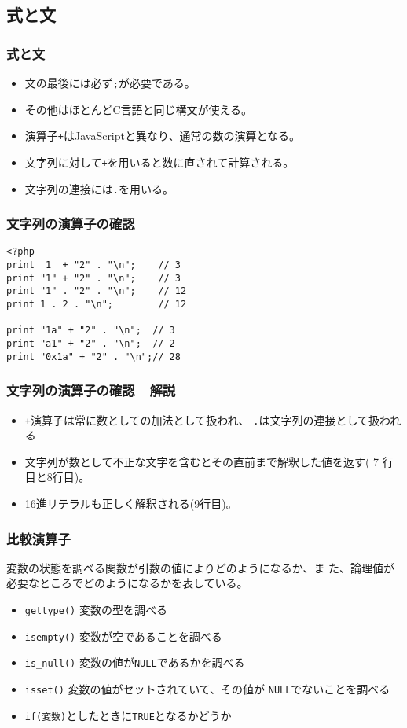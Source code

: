 \documentclass[dvipsk]{beamer}
\begin{document}
\subsection{式と文}
\begin{frame}[containsverbatim]
\frametitle{式と文}
\begin{itemize}
 \item 文の最後には必ず\texttt{;}が必要である。
 \item その他はほとんどC言語と同じ構文が使える。
 \item 演算子\texttt{+}はJavaScriptと異なり、通常の数の演算となる。
 \item 文字列に対して\texttt{+}を用いると数に直されて計算される。
 \item 文字列の連接には\texttt{.}を用いる。
\end{itemize}
\end{frame}
\begin{frame}[containsverbatim]
\frametitle{文字列の演算子の確認}
\begin{verbatim}
<?php
print  1  + "2" . "\n";    // 3
print "1" + "2" . "\n";    // 3
print "1" . "2" . "\n";    // 12
print 1 . 2 . "\n";        // 12

print "1a" + "2" . "\n";  // 3
print "a1" + "2" . "\n";  // 2
print "0x1a" + "2" . "\n";// 28
\end{verbatim}
\end{frame}
\begin{frame}[containsverbatim]
\frametitle{文字列の演算子の確認---解説}
\begin{itemize}
 \item \texttt{+}演算子は常に数としての加法として扱われ、
 \texttt{.}は文字列の連接として扱われる
 \item 文字列が数として不正な文字を含むとその直前まで解釈した値を返す(
       7 行目と8行目)。
 \item 16進リテラルも正しく解釈される(9行目)。
\end{itemize}
\end{frame}
\begin{frame}[containsverbatim]
\frametitle{比較演算子}
変数の状態を調べる関数が引数の値によりどのようになるか、ま
た、論理値が必要なところでどのようになるかを表している。
\begin{itemize}
 \item \texttt{gettype()} 変数の型を調べる
 \item \texttt{isempty()} 変数が空であることを調べる
 \item \texttt{is\_null()} 変数の値が\texttt{NULL}であるかを調べる
 \item \texttt{isset()} 変数の値がセットされていて、その値が
       \texttt{NULL}でないことを調べる
 \item \texttt{if(変数)}としたときに\texttt{TRUE}となるかどうか
\end{itemize}
\end{frame}
\end{document}

